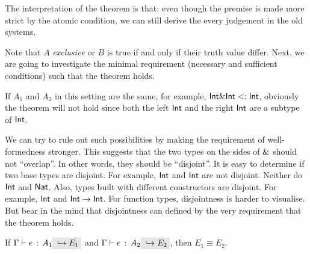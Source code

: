 The interpretation of the theorem is that: even though the premise is made more
strict by the atomic condition, we can still derive the every judgement in the
old systems. 

Note that $A$ \emph{exclusive} or $B$ is true if and only if their truth value
differ. Next, we are going to investigate the minimal requirement (necessary and
sufficient conditions) such that the theorem holds.

If $A_1$ and $A_2$ in this setting are the same, for example,
$\textsf{Int} \& \textsf{Int} <: \textsf{Int}$, obviously the theorem will
not hold since both the left $\textsf{Int}$ and the right $\textsf{Int}$ are a
subtype of $\textsf{Int}$.

We can try to rule out such possibilities by making the requirement of
well-formedness stronger. This suggests that the two types on the sides of
$\&$ should not ``overlap''. In other words, they should be ``disjoint''. It
is easy to determine if two base types are disjoint. For example, $\textsf{Int}$
and $\textsf{Int}$ are not disjoint. Neither do $\textsf{Int}$ and $\textsf{Nat}$.
Also, types built with different constructors are disjoint. For example,
$\textsf{Int}$ and $\textsf{Int} \to \textsf{Int}$. For function types, disjointness
is harder to visualise. But bear in the mind that disjointness can defined by
the very requirement that the theorem holds.

\begin{theorem} \label{unique-elaboration}
  If $\jtype \Gamma e {A_1} \yields {E_1}$ and $\jtype \Gamma e {A_2}
  \yields {E_2}$, then $E_1 \equiv E_2$.
\end{theorem}
